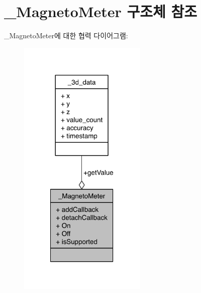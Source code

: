 \hypertarget{struct__MagnetoMeter}{\section{\-\_\-\-Magneto\-Meter 구조체 참조}
\label{struct__MagnetoMeter}
}


\-\_\-\-Magneto\-Meter에 대한 협력 다이어그램\-:\nopagebreak
\begin{figure}[H]
\begin{center}
\leavevmode
\includegraphics[width=173pt]{dc/df4/struct__MagnetoMeter__coll__graph}
\end{center}
\end{figure}
